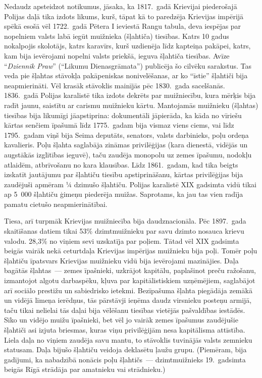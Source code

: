 \documentclass[twoside,a5paper,12pt,fleqn,openany]{extbook}
\newcommand{\pltxti}[1]{\textit{\textpolish{#1}}}
\begin{document}
Nedaudz apsteidzot notikumus, jāsaka, ka 1817.~gadā Krievijai piederošajā Polijas daļā tika izdots likums, kurš, tāpat kā to paredzēja Krievijas impērijā spēkā esošā vēl 1722.~gadā Pētera I ieviestā Rangu tabula, deva iespējas par nopelniem valsts labā iegūt muižnieka (šļahtiča) tiesības. Katrs 10 gadus nokalpojis skolotājs, katrs karavīrs, kurš uzdienēja līdz kapteiņa pakāpei, katrs, kam bija ievērojami nopelni valsts priekšā, ieguva šļahtiča tiesības. Avīze ``\pltxti{Dziennik Praw}'' (``Likumu Dienasgrāmata'') publicēja šo cilvēku sarakstus. Tas veda pie šļahtas stāvokļa pakāpeniskas nonivelēšanas, ar ko ``īstie'' šļahtiči bija neapmierināti. Vēl krasāk stāvoklis mainījās pēc 1830.~gada sacelšanās. 1836.~gadā Polijas karalistē tika izdots dekrēts par muižniecību, kura mērķis bija radīt jaunu, saistītu ar carismu muižnieku kārtu. Mantojamās muižnieku (šļahtas) tiesības bija likumīgi jāapstiprina: dokumentāli jāpierāda, ka kāda no vīriešu kārtas senčiem īpašumā līdz 1775.~gadam bija vismaz viens ciems, vai līdz 1795.~gadam viņš bija Seima deputāts, senators, valsts darbinieks, poļu ordeņa kavalieris. Poļu šļahta saglabāja zināmas privilēģijas (kara dienestā, vidējās un augstākās izglītības ieguvē), taču zaudēja monopolu uz zemes īpašumu, nodokļu atlaidēm, atbrīvošanu no kara klausības. Līdz 1861.~gadam, kad tika beigts izskatīt jautājumu par šļahtiču tiesību apstiprināšanu, kārtas privilēģijas bija zaudējuši apmēram ¼ dzimušo šļahtiču. Polijas karalistē XIX gadsimta vidū tikai ap 5~000 šļahtiču ģimeņu piederēja muižas. Saprotams, ka jau tas vien radīja pamatu cietušo neapmierinātībai.

Tiesa, arī turpmāk Krievijas muižniecība bija daudznacionāla. Pēc 1897.~gada skaitīšanas datiem tikai 53\% dzimtmuižnieku par savu dzimto nosauca krievu valodu. 28,3\% no viņiem sevi uzskatīja par poļiem. Tātad vēl XIX gadsimta beigās vairāk nekā ceturtdaļa Krievijas impērijas muižnieku bija poļi. Tomēr poļu šļahtiču īpatsvars Krievijas muižnieku vidū bija ievērojami mazinājies. Daļa bagātās šļahtas~--- zemes īpašnieki, uzkrājot kapitālu, paplašinot preču ražošanu, izmantojot algotu darbaspēku, kļuva par kapitālistiskiem uzņēmējiem, saglabājot arī sociālo prestižu un sabiedrisko ietekmi. Bezīpašuma šļahta piegādāja zemākā un vidējā līmeņa ierēdņus, tās pārstāvji ieņēma daudz virsnieku posteņu armijā, taču tikai nelielai tās daļai bija vēlēšanu tiesības vietējās pašvaldības iestādēs. Sīko un vidējo muižu īpašnieki, bet vēl jo vairāk zemes īpašumus zaudējušie šļahtiči asi izjuta briesmas, kuras viņu privilēģijām nesa kapitālisma attīstība. Liela daļa no viņiem zaudēja savu mantu, to stāvoklis tuvinājās valsts zemnieku statusam. Daļa bijušo šļahtiču veidoja deklasētu ļaužu grupu. (Piemēram, bija gadījumi, ka nabadzībā nonācis poļu šļahtičs~--- dzimtmuižnieks 19.~gadsimta beigās Rīgā strādāja par amatnieku vai strādnieku.)
\end{document}
